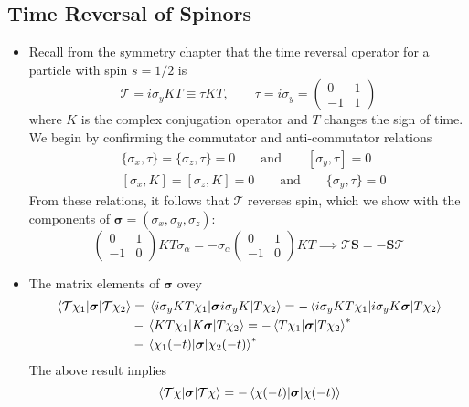 \documentclass[11pt, a4paper]{article}
\newcommand{\eqtext}[1]{\qquad \text{#1} \qquad}
\renewcommand{\vec}[1]{\bm{#1}}  %
\renewcommand{\S}{\vec{S}}  %
\newcommand{\T}{\mathcal{T}}  %
\begin{document}
\subsection{Time Reversal of Spinors}
\begin{itemize}
	\item Recall from the symmetry chapter that the time reversal operator for a particle with spin $ s = 1/2 $ is 
	\begin{equation*}
		\T = i \sigma_{y} KT \equiv \tau KT, \qquad \tau = i \sigma_{y} =
		\begin{pmatrix}
			0 & 1\\
			-1 & 1
		\end{pmatrix}
	\end{equation*}
	where $ K $ is the complex conjugation operator and $ T $ changes the sign of time. We begin by confirming the commutator and anti-commutator relations
	\begin{align*}
		&\{\sigma_{x}, \tau\} = \{\sigma_{z}, \tau\} = 0 \eqtext{and} [\sigma_{y}, \tau] = 0\\
		&[\sigma_{x}, K] = [\sigma_{z}, K] = 0 \eqtext{and} \{\sigma_{y}, \tau\} = 0
	\end{align*}
	From these relations, it follows that $ \T $ reverses spin, which we show with the components of $ \vec{\sigma} = (\sigma_{x}, \sigma_{y}, \sigma_{z}) $:
	\begin{equation*}
		\begin{pmatrix}
			0 & 1\\
			-1 & 0
		\end{pmatrix}
		K T \sigma_{\alpha} = - \sigma_{\alpha}
		\begin{pmatrix}
			0 & 1\\
			-1 & 0
		\end{pmatrix}
		KT
		\implies \T \S = - \S \T
	\end{equation*}
	
	\item The matrix elements of $ \vec{\sigma} $ ovey
	\begin{align*}
		\mel{\T \chi_{1}}{\vec{\sigma}}{\T \chi_{2}} &= \mel{i\sigma_{y}KT\chi_{1}}{\vec{\sigma}i \sigma_{y}K}{T\chi_{2}} = - \mel{i\sigma_{y}KT\chi_{1}}{i \sigma_{y}K \vec{\sigma}}{T\chi_{2}} \\
		& - \mel{KT\chi_{1}}{K \vec{\sigma}}{T\chi_{2}} = -\mel{T\chi_{1}}{\vec{\sigma}}{T\chi_{2}}^{*}\\
		& -\mel{\chi_{1}(-t)}{\vec{\sigma}}{\chi_{2}(-t)}^{*}
	\end{align*}
	The above result implies
	\begin{equation*}
		\mel{\T \chi}{\vec{\sigma}}{\T \chi} = -\mel{\chi(-t)}{\vec{\sigma}}{\chi(-t)}
	\end{equation*}
	

\end{itemize}
\end{document}
